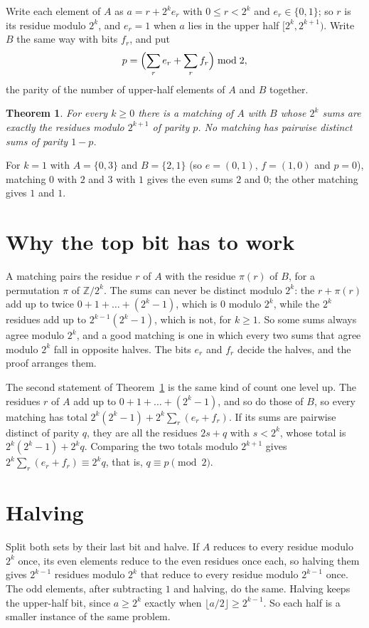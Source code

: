 \documentclass[11pt]{amsart}
\newtheorem{theorem}{Theorem}
\theoremstyle{remark}
\begin{document}
Write each element of $A$ as $a=r+2^ke_r$ with $0\le r<2^k$ and $e_r\in\{0,1\}$; so $r$ is its residue modulo $2^k$, and $e_r=1$ when $a$ lies in the upper half $[2^k,2^{k+1})$. Write $B$ the same way with bits $f_r$, and put
\[
p=\Bigl(\sum_re_r+\sum_rf_r\Bigr)\bmod 2,
\]
the parity of the number of upper-half elements of $A$ and $B$ together.

\begin{theorem}\label{thm:main}
For every $k\ge0$ there is a matching of $A$ with $B$ whose $2^k$ sums are exactly the residues modulo $2^{k+1}$ of parity $p$. No matching has pairwise distinct sums of parity $1-p$.
\end{theorem}

For $k=1$ with $A=\{0,3\}$ and $B=\{2,1\}$ (so $e=(0,1)$, $f=(1,0)$ and $p=0$), matching $0$ with $2$ and $3$ with $1$ gives the even sums $2$ and $0$; the other matching gives $1$ and $1$.

\section{Why the top bit has to work}

A matching pairs the residue $r$ of $A$ with the residue $\pi(r)$ of $B$, for a permutation $\pi$ of $\mathbb Z/2^k$. The sums can never be distinct modulo $2^k$: the $r+\pi(r)$ add up to twice $0+1+\dots+(2^k-1)$, which is $0$ modulo $2^k$, while the $2^k$ residues add up to $2^{k-1}(2^k-1)$, which is not, for $k\ge1$. So some sums always agree modulo $2^k$, and a good matching is one in which every two sums that agree modulo $2^k$ fall in opposite halves. The bits $e_r$ and $f_r$ decide the halves, and the proof arranges them.

The second statement of Theorem~\ref{thm:main} is the same kind of count one level up. The residues $r$ of $A$ add up to $0+1+\dots+(2^k-1)$, and so do those of $B$, so every matching has total $2^k(2^k-1)+2^k\sum_r(e_r+f_r)$. If its sums are pairwise distinct of parity $q$, they are all the residues $2s+q$ with $s<2^k$, whose total is $2^k(2^k-1)+2^kq$. Comparing the two totals modulo $2^{k+1}$ gives $2^k\sum_r(e_r+f_r)\equiv2^kq$, that is, $q\equiv p\pmod 2$.

\section{Halving}

Split both sets by their last bit and halve. If $A$ reduces to every residue modulo $2^k$ once, its even elements reduce to the even residues once each, so halving them gives $2^{k-1}$ residues modulo $2^k$ that reduce to every residue modulo $2^{k-1}$ once. The odd elements, after subtracting $1$ and halving, do the same. Halving keeps the upper-half bit, since $a\ge2^k$ exactly when $\lfloor a/2\rfloor\ge2^{k-1}$. So each half is a smaller instance of the same problem.
\end{document}
